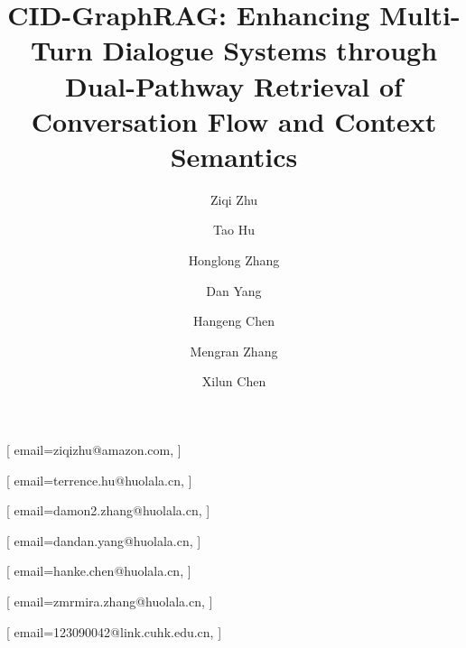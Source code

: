 \documentclass[
]{style/ceurart}
\begin{document}


\title{CID-GraphRAG: Enhancing Multi-Turn Dialogue Systems through Dual-Pathway Retrieval of Conversation Flow and Context Semantics}


\author[1]{Ziqi Zhu}[%
email=ziqizhu@amazon.com,
]

\author[2]{Tao Hu}[%
email=terrence.hu@huolala.cn,
]

\author[2]{Honglong Zhang}[%
email=damon2.zhang@huolala.cn,
]

\author[2]{Dan Yang}[%
email=dandan.yang@huolala.cn,
]

\author[2]{Hangeng Chen}[%
email=hanke.chen@huolala.cn,
]

\author[2]{Mengran Zhang}[%
email=zmrmira.zhang@huolala.cn,
]

\author[3]{Xilun Chen}[%
email=123090042@link.cuhk.edu.cn,
]

\address[1]{Amazon Web Services}
\address[2]{HuoLaLa}
\address[3]{The Chinese University of Hong Kong, Shenzhen}
\end{document}

